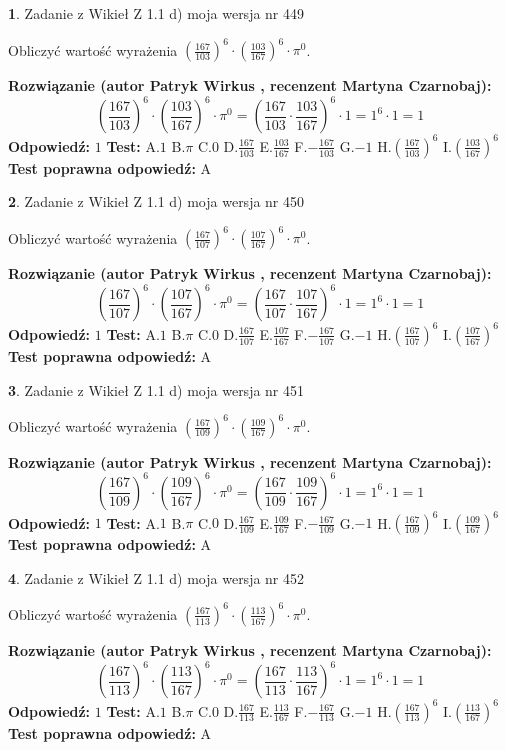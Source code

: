 \documentclass[12pt, a4paper]{article}
\theoremstyle{definition} %
\newtheorem{zad}{}
\newcommand{\zadStart}[1]{\begin{zad}#1\newline}
\newcommand{\zadStop}{\end{zad}}
\newcommand{\rozwStart}[2]{\noindent \textbf{Rozwiązanie (autor #1 , recenzent #2): }\newline}
\newcommand{\rozwStop}{\newline}
\newcommand{\odpStart}{\noindent \textbf{Odpowiedź:}\newline}
\newcommand{\odpStop}{\newline}
\newcommand{\testStart}{\noindent \textbf{Test:}\newline}
\newcommand{\testStop}{\newline}
\newcommand{\kluczStart}{\noindent \textbf{Test poprawna odpowiedź:}\newline}
\newcommand{\kluczStop}{\newline}
\begin{document}
\zadStart{Zadanie z Wikieł Z 1.1 d) moja wersja nr 449}

Obliczyć wartość wyrażenia $(\frac{167}{103})^{6} \cdot (\frac{103}{167})^{6} \cdot \pi^{0}$.
\zadStop
\rozwStart{Patryk Wirkus}{Martyna Czarnobaj}
$$(\frac{167}{103})^{6} \cdot (\frac{103}{167})^{6} \cdot \pi^{0} = (\frac{167}{103} \cdot \frac{103}{167})^{6} \cdot 1 = 1^{6} \cdot 1 = 1$$
\rozwStop
\odpStart
$1$
\odpStop
\testStart
A.$1$ B.$\pi$ C.$0$ D.$\frac{167}{103}$ E.$\frac{103}{167}$
F.$-\frac{167}{103}$ G.$-1$
H.$(\frac{167}{103})^{6}$
I.$(\frac{103}{167})^{6}$
\testStop
\kluczStart
A
\kluczStop



\zadStart{Zadanie z Wikieł Z 1.1 d) moja wersja nr 450}

Obliczyć wartość wyrażenia $(\frac{167}{107})^{6} \cdot (\frac{107}{167})^{6} \cdot \pi^{0}$.
\zadStop
\rozwStart{Patryk Wirkus}{Martyna Czarnobaj}
$$(\frac{167}{107})^{6} \cdot (\frac{107}{167})^{6} \cdot \pi^{0} = (\frac{167}{107} \cdot \frac{107}{167})^{6} \cdot 1 = 1^{6} \cdot 1 = 1$$
\rozwStop
\odpStart
$1$
\odpStop
\testStart
A.$1$ B.$\pi$ C.$0$ D.$\frac{167}{107}$ E.$\frac{107}{167}$
F.$-\frac{167}{107}$ G.$-1$
H.$(\frac{167}{107})^{6}$
I.$(\frac{107}{167})^{6}$
\testStop
\kluczStart
A
\kluczStop



\zadStart{Zadanie z Wikieł Z 1.1 d) moja wersja nr 451}

Obliczyć wartość wyrażenia $(\frac{167}{109})^{6} \cdot (\frac{109}{167})^{6} \cdot \pi^{0}$.
\zadStop
\rozwStart{Patryk Wirkus}{Martyna Czarnobaj}
$$(\frac{167}{109})^{6} \cdot (\frac{109}{167})^{6} \cdot \pi^{0} = (\frac{167}{109} \cdot \frac{109}{167})^{6} \cdot 1 = 1^{6} \cdot 1 = 1$$
\rozwStop
\odpStart
$1$
\odpStop
\testStart
A.$1$ B.$\pi$ C.$0$ D.$\frac{167}{109}$ E.$\frac{109}{167}$
F.$-\frac{167}{109}$ G.$-1$
H.$(\frac{167}{109})^{6}$
I.$(\frac{109}{167})^{6}$
\testStop
\kluczStart
A
\kluczStop



\zadStart{Zadanie z Wikieł Z 1.1 d) moja wersja nr 452}

Obliczyć wartość wyrażenia $(\frac{167}{113})^{6} \cdot (\frac{113}{167})^{6} \cdot \pi^{0}$.
\zadStop
\rozwStart{Patryk Wirkus}{Martyna Czarnobaj}
$$(\frac{167}{113})^{6} \cdot (\frac{113}{167})^{6} \cdot \pi^{0} = (\frac{167}{113} \cdot \frac{113}{167})^{6} \cdot 1 = 1^{6} \cdot 1 = 1$$
\rozwStop
\odpStart
$1$
\odpStop
\testStart
A.$1$ B.$\pi$ C.$0$ D.$\frac{167}{113}$ E.$\frac{113}{167}$
F.$-\frac{167}{113}$ G.$-1$
H.$(\frac{167}{113})^{6}$
I.$(\frac{113}{167})^{6}$
\testStop
\kluczStart
A
\kluczStop
\end{document}
